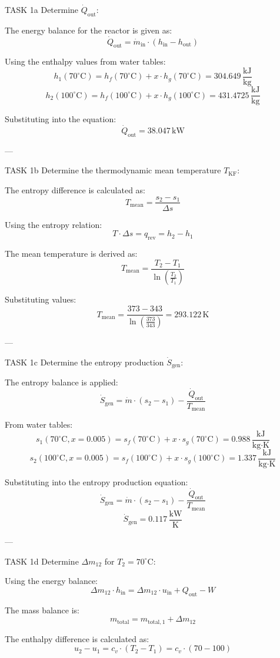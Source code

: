 TASK 1a  
Determine \( \dot{Q}_{\text{out}} \):  

The energy balance for the reactor is given as:  
\[
\dot{Q}_{\text{out}} = \dot{m}_{\text{in}} \cdot (h_{\text{in}} - h_{\text{out}})
\]  

Using the enthalpy values from water tables:  
\[
h_1(70^\circ\text{C}) = h_f(70^\circ\text{C}) + x \cdot h_g(70^\circ\text{C}) = 304.649 \, \frac{\text{kJ}}{\text{kg}}
\]  
\[
h_2(100^\circ\text{C}) = h_f(100^\circ\text{C}) + x \cdot h_g(100^\circ\text{C}) = 431.4725 \, \frac{\text{kJ}}{\text{kg}}
\]  

Substituting into the equation:  
\[
\dot{Q}_{\text{out}} = 38.047 \, \text{kW}
\]  

---

TASK 1b  
Determine the thermodynamic mean temperature \( T_{\text{KF}} \):  

The entropy difference is calculated as:  
\[
T_{\text{mean}} = \frac{s_2 - s_1}{\Delta s}
\]  

Using the entropy relation:  
\[
T \cdot \Delta s = q_{\text{rev}} = h_2 - h_1
\]  

The mean temperature is derived as:  
\[
T_{\text{mean}} = \frac{T_2 - T_1}{\ln\left(\frac{T_2}{T_1}\right)}
\]  

Substituting values:  
\[
T_{\text{mean}} = \frac{373 - 343}{\ln\left(\frac{373}{343}\right)} = 293.122 \, \text{K}
\]  

---

TASK 1c  
Determine the entropy production \( \dot{S}_{\text{gen}} \):  

The entropy balance is applied:  
\[
\dot{S}_{\text{gen}} = \dot{m} \cdot (s_2 - s_1) - \frac{\dot{Q}_{\text{out}}}{T_{\text{mean}}}
\]  

From water tables:  
\[
s_1(70^\circ\text{C}, x = 0.005) = s_f(70^\circ\text{C}) + x \cdot s_g(70^\circ\text{C}) = 0.988 \, \frac{\text{kJ}}{\text{kg·K}}
\]  
\[
s_2(100^\circ\text{C}, x = 0.005) = s_f(100^\circ\text{C}) + x \cdot s_g(100^\circ\text{C}) = 1.337 \, \frac{\text{kJ}}{\text{kg·K}}
\]  

Substituting into the entropy production equation:  
\[
\dot{S}_{\text{gen}} = \dot{m} \cdot (s_2 - s_1) - \frac{\dot{Q}_{\text{out}}}{T_{\text{mean}}}
\]  
\[
\dot{S}_{\text{gen}} = 0.117 \, \frac{\text{kW}}{\text{K}}
\]  

---

TASK 1d  
Determine \( \Delta m_{12} \) for \( T_2 = 70^\circ\text{C} \):  

Using the energy balance:  
\[
\Delta m_{12} \cdot h_{\text{in}} = \Delta m_{12} \cdot u_{\text{in}} + Q_{\text{out}} - W
\]  

The mass balance is:  
\[
m_{\text{total}} = m_{\text{total},1} + \Delta m_{12}
\]  

The enthalpy difference is calculated as:  
\[
u_2 - u_1 = c_v \cdot (T_2 - T_1) = c_v \cdot (70 - 100)
\]  

